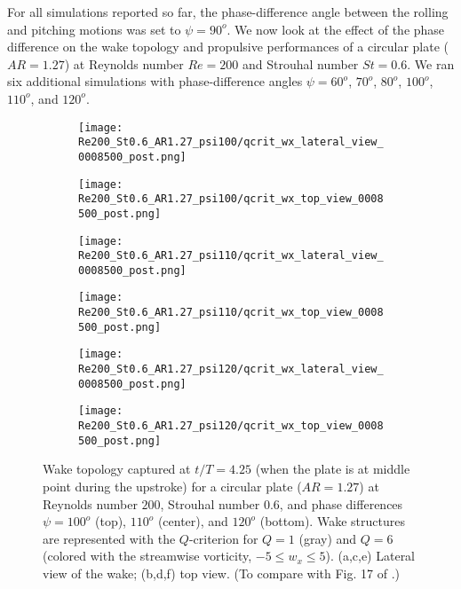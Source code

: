 For all simulations reported so far, the phase-difference angle between the rolling and pitching motions was set to $\psi = 90^o$.
We now look at the effect of the phase difference on the wake topology and propulsive performances of a circular plate ($AR = 1.27$) at Reynolds number $Re = 200$ and Strouhal number $St = 0.6$.
We ran six additional simulations with phase-difference angles $\psi = 60^o$, $70^o$, $80^o$, $100^o$, $110^o$, and $120^o$.

\begin{figure}[!h]
  \centering
  \begin{subfigure}[]{0.45\textwidth}
    \centering
    \texttt{[image: Re200\_St0.6\_AR1.27\_psi100/qcrit\_wx\_lateral\_view\_0008500\_post.png]}
    \caption{}
    \label{fig:phase_wake_topology:100_lateral}
  \end{subfigure}
  \hfill
  \begin{subfigure}[]{0.45\textwidth}
    \centering
    \texttt{[image: Re200\_St0.6\_AR1.27\_psi100/qcrit\_wx\_top\_view\_0008500\_post.png]}
    \caption{}
    \label{fig:phase_wake_topology:100_top}
  \end{subfigure}
  \vspace{1cm}
  \begin{subfigure}[]{0.45\textwidth}
    \centering
    \texttt{[image: Re200\_St0.6\_AR1.27\_psi110/qcrit\_wx\_lateral\_view\_0008500\_post.png]}
    \caption{}
    \label{fig:phase_wake_topology:110_lateral}
  \end{subfigure}
  \hfill
  \begin{subfigure}[]{0.45\textwidth}
    \centering
    \texttt{[image: Re200\_St0.6\_AR1.27\_psi110/qcrit\_wx\_top\_view\_0008500\_post.png]}
    \caption{}
    \label{fig:phase_wake_topology:110_top}
  \end{subfigure}
  \vspace{1cm}
  \begin{subfigure}[]{0.45\textwidth}
    \centering
    \texttt{[image: Re200\_St0.6\_AR1.27\_psi120/qcrit\_wx\_lateral\_view\_0008500\_post.png]}
    \caption{}
    \label{fig:phase_wake_topology:120_lateral}
  \end{subfigure}
  \hfill
  \begin{subfigure}[]{0.45\textwidth}
    \centering
    \texttt{[image: Re200\_St0.6\_AR1.27\_psi120/qcrit\_wx\_top\_view\_0008500\_post.png]}
    \caption{}
    \label{fig:phase_wake_topology:120_top}
  \end{subfigure}
  \caption{Wake topology captured at $t / T = 4.25$ (when the plate is at middle point during the upstroke) for a circular plate ($AR = 1.27$) at Reynolds number $200$, Strouhal number $0.6$, and phase differences $\psi = 100^o$ (top), $110^o$ (center), and $120^o$ (bottom). Wake structures are represented with the $Q$-criterion for $Q = 1$ (gray) and $Q = 6$ (colored with the streamwise vorticity, $-5 \leq w_x \leq 5$). (a,c,e) Lateral view of the wake; (b,d,f) top view. (To compare with Fig. 17 of \citet{li_dong_2016}.)}
  \label{fig:phase_wake_topology}
\end{figure}

